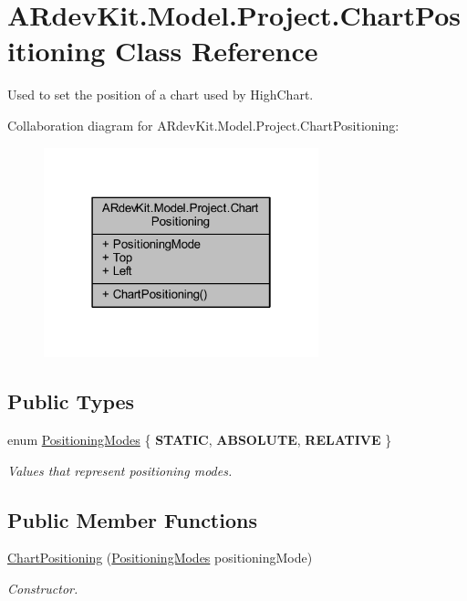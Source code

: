 \hypertarget{class_a_rdev_kit_1_1_model_1_1_project_1_1_chart_positioning}{\section{A\-Rdev\-Kit.\-Model.\-Project.\-Chart\-Positioning Class Reference}
\label{class_a_rdev_kit_1_1_model_1_1_project_1_1_chart_positioning}
}


Used to set the position of a chart used by High\-Chart.  




Collaboration diagram for A\-Rdev\-Kit.\-Model.\-Project.\-Chart\-Positioning\-:
\nopagebreak
\begin{figure}[H]
\begin{center}
\leavevmode
\includegraphics[width=226pt]{class_a_rdev_kit_1_1_model_1_1_project_1_1_chart_positioning__coll__graph}
\end{center}
\end{figure}
\subsection*{Public Types}
\begin{DoxyCompactItemize}
\item 
enum \hyperlink{class_a_rdev_kit_1_1_model_1_1_project_1_1_chart_positioning_ab74042f3d8ce77f994987c15831d76a2}{Positioning\-Modes} \{ {\bfseries S\-T\-A\-T\-I\-C}, 
{\bfseries A\-B\-S\-O\-L\-U\-T\-E}, 
{\bfseries R\-E\-L\-A\-T\-I\-V\-E}
 \}
\begin{DoxyCompactList}\small\item\em Values that represent positioning modes. \end{DoxyCompactList}\end{DoxyCompactItemize}
\subsection*{Public Member Functions}
\begin{DoxyCompactItemize}
\item 
\hyperlink{class_a_rdev_kit_1_1_model_1_1_project_1_1_chart_positioning_a7e26c81e7d9989be224634e219cb4dc2}{Chart\-Positioning} (\hyperlink{class_a_rdev_kit_1_1_model_1_1_project_1_1_chart_positioning_ab74042f3d8ce77f994987c15831d76a2}{Positioning\-Modes} positioning\-Mode)
\begin{DoxyCompactList}\small\item\em Constructor. \end{DoxyCompactList}\end{DoxyCompactItemize}
